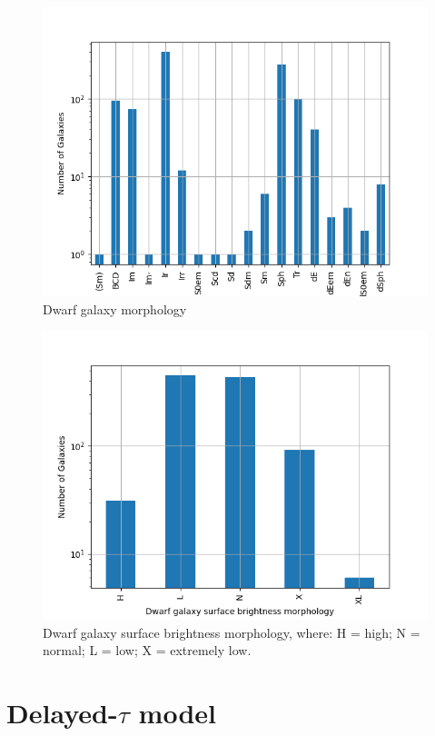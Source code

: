 \documentclass[a4paper,twocolumn]{article}
\begin{document}
\begin{figure}[htbp]
\centering
\includegraphics[width=.9\linewidth]{./figs/hist-Tdw1.png}
\caption{\label{Types of dwarf galaxies}Dwarf galaxy morphology}
\end{figure}

\begin{figure}[htbp]
\centering
\includegraphics[width=.9\linewidth]{./figs/hist-Tdw2.png}
\caption{\label{Types of dwarf galaxies brightness}Dwarf galaxy surface brightness morphology, where: H = high; N = normal; L = low; X = extremely low.}
\end{figure}


\section{Delayed-\(\tau\) model}
\label{sec:org9d3ca76}
\end{document}
